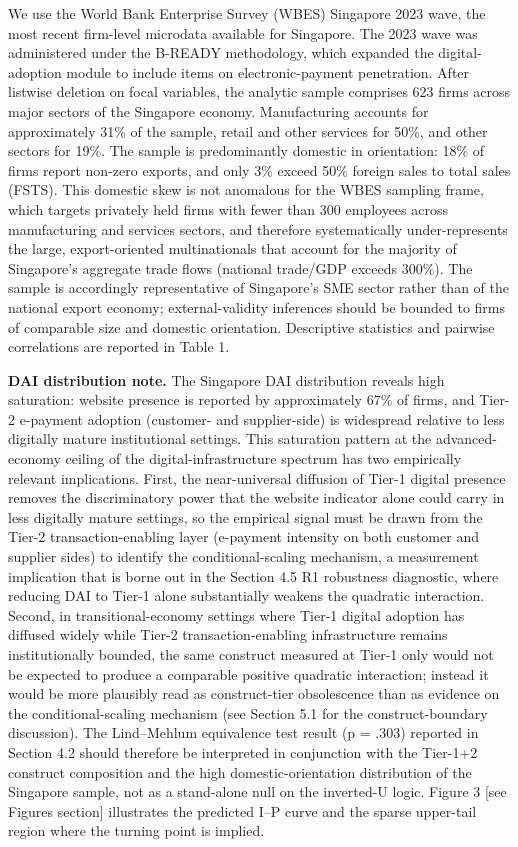\documentclass[
  12pt,a4paper]{article}
\begin{document}
We use the World Bank Enterprise Survey (WBES) Singapore 2023 wave, the
most recent firm-level microdata available for Singapore. The 2023 wave
was administered under the B-READY methodology, which expanded the
digital-adoption module to include items on electronic-payment
penetration. After listwise deletion on focal variables, the analytic
sample comprises 623 firms across major sectors of the Singapore
economy. Manufacturing accounts for approximately 31\% of the sample,
retail and other services for 50\%, and other sectors for 19\%. The
sample is predominantly domestic in orientation: 18\% of firms report
non-zero exports, and only 3\% exceed 50\% foreign sales to total sales
(FSTS). This domestic skew is not anomalous for the WBES sampling frame,
which targets privately held firms with fewer than 300 employees across
manufacturing and services sectors, and therefore systematically
under-represents the large, export-oriented multinationals that account
for the majority of Singapore's aggregate trade flows (national
trade/GDP exceeds 300\%). The sample is accordingly representative of
Singapore's SME sector rather than of the national export economy;
external-validity inferences should be bounded to firms of comparable
size and domestic orientation. Descriptive statistics and pairwise
correlations are reported in Table 1.

\textbf{DAI distribution note.} The Singapore DAI distribution reveals
high saturation: website presence is reported by approximately 67\% of
firms, and Tier-2 e-payment adoption (customer- and supplier-side) is
widespread relative to less digitally mature institutional settings.
This saturation pattern at the advanced-economy ceiling of the
digital-infrastructure spectrum has two empirically relevant
implications. First, the near-universal diffusion of Tier-1 digital
presence removes the discriminatory power that the website indicator
alone could carry in less digitally mature settings, so the empirical
signal must be drawn from the Tier-2 transaction-enabling layer
(e-payment intensity on both customer and supplier sides) to identify
the conditional-scaling mechanism, a measurement implication that is
borne out in the Section 4.5 R1 robustness diagnostic, where reducing
DAI to Tier-1 alone substantially weakens the quadratic interaction.
Second, in transitional-economy settings where Tier-1 digital adoption
has diffused widely while Tier-2 transaction-enabling infrastructure
remains institutionally bounded, the same construct measured at Tier-1
only would not be expected to produce a comparable positive quadratic
interaction; instead it would be more plausibly read as construct-tier
obsolescence than as evidence on the conditional-scaling mechanism (see
Section 5.1 for the construct-boundary discussion). The Lind--Mehlum
equivalence test result (p = .303) reported in Section 4.2 should
therefore be interpreted in conjunction with the Tier-1+2 construct
composition and the high domestic-orientation distribution of the
Singapore sample, not as a stand-alone null on the inverted-U logic.
Figure 3 {[}see Figures section{]} illustrates the predicted I--P curve
and the sparse upper-tail region where the turning point is implied.
\end{document}
